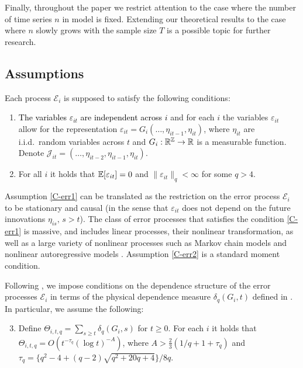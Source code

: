\documentclass[a4paper,12pt]{article}
\makeatletter
\renewcommand{\eqref}[1]{\tagform@{\ref{#1}}}
\makeatother
\begin{document}
Finally, throughout the paper we restrict attention to the case where the number of time series $n$ in model \eqref{eq:model_full} is fixed. Extending our theoretical results to the case where $n$ slowly grows with the sample size $T$ is a possible topic for further research.

\subsection{Assumptions}\label{subsec:model_assumptions}

Each process $\mathcal{E}_i$ is supposed to satisfy the following conditions: 

\begin{enumerate}[label=(C\arabic*),leftmargin=1.05cm]

\item \label{C-err1} \textcolor{black}{The variables $\varepsilon_{it}$ are independent across $i$} and for each $i$ the variables $\varepsilon_{it}$ allow for the representation $\varepsilon_{it} = G_i(\ldots,\eta_{it-1},\eta_{it})$, where $\eta_{it}$ are i.i.d.\ random variables across $t$ and $G_i: \mathbb{R}^{\mathbb{Z}} \rightarrow \mathbb{R}$ is a measurable function. Denote \linebreak $\mathcal{J}_{it} = (\ldots,\eta_{it-2},\eta_{it-1},\eta_{it})$.

\item \label{C-err2} For all $i$ it holds that $\mathbb{E}[\varepsilon_{it}] =0$ and $\| \varepsilon_{it} \|_q < \infty$ for some $q > 4$.
\end{enumerate}
Assumption \ref{C-err1} can be translated as the restriction on the error process $\mathcal{E}_i$ to be stationary and causal (in the sense that $\varepsilon_{it}$ does not depend on the future innovations $\eta_{is},\, s >t$). The class of error processes that satisfies the condition \ref{C-err1} is massive, and includes linear processes, their nonlinear transformation, as well as a large variety of nonlinear processes such as Markov chain models and nonlinear autoregressive models \citep[][]{Wu2016}. Assumption \ref{C-err2} is a standard moment condition.

Following \cite{Wu2005}, we impose conditions on the dependence structure of the error processes $\mathcal{E}_i$ in terms of the physical dependence measure $\delta_q(G_i, t)$ defined in \eqref{eq:physical_dep}. In particular, we assume the following: 
\begin{enumerate}[label=(C\arabic*),leftmargin=1.05cm]
\setcounter{enumi}{2}

\item \label{C-err3} Define $\Theta_{i, t,q} = \sum\nolimits_{s \ge t} \delta_q(G_i, s)$ for $t \ge 0$. For each $i$ it holds that \linebreak
$\Theta_{i, t,q} = O ( t^{-\tau_q} (\log t)^{-A} )$,  
where $A > \frac{2}{3} (1/q + 1 + \tau_q)$ and \linebreak $\tau_q = \{q^2 - 4 + (q-2) \sqrt{q^2 + 20q + 4}\} / 8q$. 

\end{enumerate}
\end{document}
